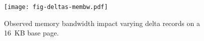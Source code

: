 \begin{figure}[H]
\texttt{[image: fig-deltas-membw.pdf]}
\caption{Observed memory bandwidth impact varying delta records on a 16~KB base page.}
\label{fig:deltas-membw}
\end{figure}
